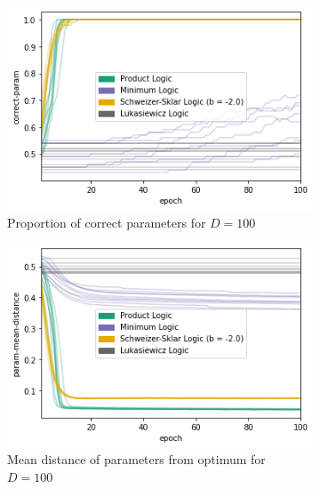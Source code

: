 \begin{figure}[h]
    \centering
    \begin{subfigure}[t]{0.45\textwidth}
        \centering
        \includegraphics[width=\textwidth]{imgs/conj-cp-100dim-keep50-5t.png}
        \caption{Proportion of correct parameters for $D=100$}
        \label{fig:conjconvcpd100}
    \end{subfigure}
    \begin{subfigure}[t]{0.45\textwidth}
        \centering
        \includegraphics[width=\textwidth]{imgs/conj-pmd-100dim-keep50-5t.png}
        \caption{Mean distance of parameters from optimum for ${D=100}$}
        \label{fig:conjconvpmdd100}
    \end{subfigure}
    \begin{subfigure}[t]{0.45\textwidth}
        \centering

\end{subfigure}
\end{figure}
